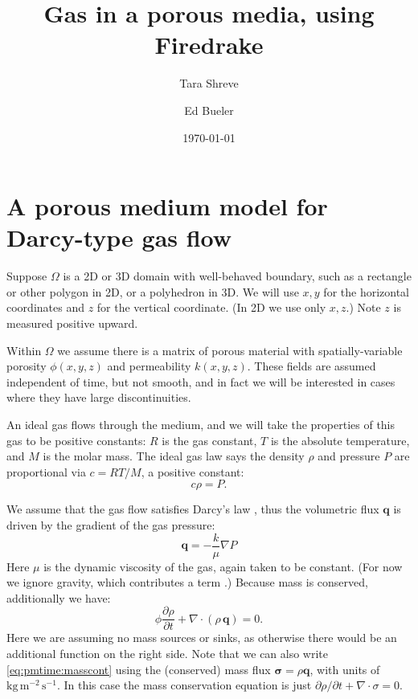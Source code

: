 \documentclass[11pt]{amsart}
\title{Gas in a porous media, using Firedrake}
\author{Tara Shreve}
\author{Ed Bueler}
\date{\today}
\newcommand{\bq}{\mathbf{q}}
\newcommand{\bsigma}{\bm{\sigma}}
\newcommand{\Div}{\nabla\cdot}
\newcommand{\grad}{\nabla}
\begin{document}
\maketitle

\thispagestyle{empty}

\section{A porous medium model for Darcy-type gas flow}

Suppose $\Omega$ is a 2D or 3D domain with well-behaved boundary, such as a rectangle or other polygon in 2D, or a polyhedron in 3D.  We will use $x,y$ for the horizontal coordinates and $z$ for the vertical coordinate.  (In 2D we use only $x,z$.)  Note $z$ is measured positive upward.

Within $\Omega$ we assume there is a matrix of porous material with spatially-variable porosity $\phi(x,y,z)$ and permeability $k(x,y,z)$.  These fields are assumed independent of time, but not smooth, and in fact we will be interested in cases where they have large discontinuities.

An ideal gas flows through the medium, and we will take the properties of this gas to be positive constants: $R$ is the gas constant, $T$ is the absolute temperature, and $M$ is the molar mass.  The ideal gas law says the density $\rho$ and pressure $P$ are proportional via $c = RT/M$, a positive constant:
\begin{equation}
c \rho = P.  \label{eq:ideal}
\end{equation}

We assume that the gas flow satisfies Darcy's law \citep{Fowler2011}, thus the volumetric flux $\bq$ is driven by the gradient of the gas pressure:
\begin{equation}
\bq = - \frac{k}{\mu} \grad P \label{eq:pmtime:darcy}
\end{equation}
Here $\mu$ is the dynamic viscosity of the gas, again taken to be constant.  (For now we ignore gravity, which contributes a term \citep{Collinson2012}.)  Because mass is conserved, additionally we have:
\begin{equation}
\phi \frac{\partial \rho}{\partial t} + \Div \left(\rho\, \bq\right) = 0. \label{eq:pmtime:masscont}
\end{equation}
Here we are assuming no mass sources or sinks, as otherwise there would be an additional function on the right side.  Note that we can also write \eqref{eq:pmtime:masscont} using the (conserved) mass flux $\bsigma = \rho \bq$, with units of $\text{kg}\,\text{m}^{-2}\,\text{s}^{-1}$.  In this case the mass conservation equation is just $\partial \rho / \partial t + \Div \sigma = 0$.
\end{document}
